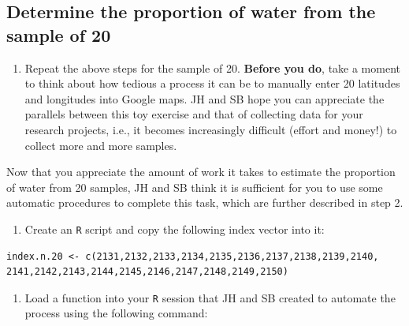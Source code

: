\documentclass[letterpaper,9pt,twoside,printwatermark=false]{pinp}
\providecommand{\tightlist}{%
  \setlength{\itemsep}{0pt}\setlength{\parskip}{0pt}}
\begin{document}
\subsection{Determine the proportion of water from the sample of
20}\label{determine-the-proportion-of-water-from-the-sample-of-20}

\begin{enumerate}
\def\labelenumi{\arabic{enumi}.}
\tightlist
\item
  Repeat the above steps for the sample of 20. \textbf{Before you do},
  take a moment to think about how tedious a process it can be to
  manually enter 20 latitudes and longitudes into Google maps. JH and SB
  hope you can appreciate the parallels between this toy exercise and
  that of collecting data for your research projects, i.e., it becomes
  increasingly difficult (effort and money!) to collect more and more
  samples.
\end{enumerate}

Now that you appreciate the amount of work it takes to estimate the
proportion of water from 20 samples, JH and SB think it is sufficient
for you to use some automatic procedures to complete this task, which
are further described in step 2.

\begin{enumerate}
\def\labelenumi{\arabic{enumi}.}
\setcounter{enumi}{1}
\tightlist
\item
  Create an \texttt{R} script and copy the following index vector into
  it:
\end{enumerate}

\begin{ShadedResult}
\begin{verbatim}
index.n.20 <- c(2131,2132,2133,2134,2135,2136,2137,2138,2139,2140,
2141,2142,2143,2144,2145,2146,2147,2148,2149,2150)
\end{verbatim}
\end{ShadedResult}

\begin{enumerate}
\def\labelenumi{\arabic{enumi}.}
\setcounter{enumi}{2}
\tightlist
\item
  Load a function into your \texttt{R} session that JH and SB created to
  automate the process using the following command:
\end{enumerate}

\begin{Shaded}
\begin{Highlighting}[]
\NormalTok{(}\NormalTok{)}
\end{Highlighting}
\end{Shaded}
\end{document}
